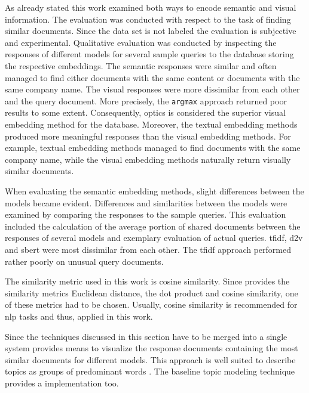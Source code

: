 As already stated this work examined both ways to encode semantic and visual information.
The evaluation was conducted with respect to the task of finding similar documents.
Since the data set is not labeled the evaluation is subjective and experimental.
Qualitative evaluation was conducted by inspecting the responses of different models for several sample queries to the database 
storing the respective embeddings.
The semantic responses were similar and often managed to find either documents with the same content or documents with the same company name.
The visual responses were more dissimilar from each other and the query document.
More precisely, the \texttt{argmax} approach returned poor results to some extent.
Consequently, \ac{optics} is considered the superior visual embedding method for the database.
Moreover, the textual embedding methods produced more meaningful responses than the visual embedding methods.
For example, textual embedding methods managed to find documents with the same company name, 
while the visual embedding methods naturally return visually similar documents.


When evaluating the semantic embedding methods, slight differences between the models became evident.
Differences and similarities between the models were examined by comparing the responses to the sample queries.
This evaluation included the calculation of the average portion of shared documents between the responses of several models 
and exemplary evaluation of actual queries.
\ac{tfidf}, \ac{d2v} and \ac{sbert} were most dissimilar from each other.
The \ac{tfidf} approach performed rather poorly on unusual query documents.


The similarity metric used in this work is cosine similarity.
Since \databaseName{} provides the similarity metrics Euclidean distance, the dot product and cosine similarity,
one of these metrics had to be chosen.
Usually, cosine similarity is recommended for \ac{nlp} tasks and thus, applied in this work.

Since the techniques discussed in this section have to be merged into a single system 
\wordcloud{} provides means to visualize the response documents containing the most similar documents for different models.
This approach is well suited to describe topics as groups of predominant words \cite{topic_modeling2019}.
The baseline topic modeling technique \topTwovec{} provides a \wordcloud{} implementation too.

